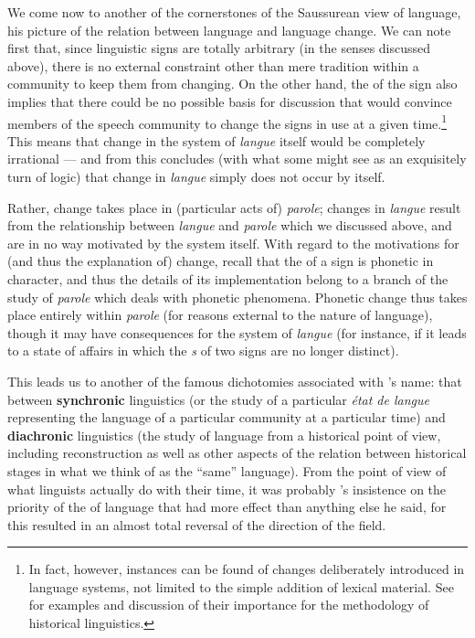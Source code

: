 We come now to another of the cornerstones of the Saussurean view of
language, his picture of the relation between language and language
change.  We can note first that, since linguistic signs are totally
arbitrary (in the senses discussed above), there is no external
constraint other than mere tradition within a community to keep them
from changing.  On the other hand, the  of the sign also
implies that there could be no possible basis for discussion that
would convince members of the speech community to change the signs in
use at a given time.\footnote{In fact, however, instances can be found
  of changes deliberately introduced in language systems, not limited
  to the simple addition of lexical material. See
  \citet{thomason06:intentional,thomason07:deliberate} for examples
  and discussion of their importance for the methodology of historical
  linguistics.}  This means that change in the system of \emph{langue}
itself would be completely irrational --- and from this {\Saussure}
concludes (with what some might see as an exquisitely  turn of
logic) that change in \emph{langue} simply does not occur by itself.

Rather, change takes place in (particular acts of) \emph{parole};
changes in \emph{langue} result from the relationship between
\emph{langue} and \emph{parole} which we discussed above, and
are in no way motivated by the system itself.  With regard to the
motivations for (and thus the {explanation} of) change, recall that the
\emph{} of a sign is phonetic in character, and thus the
details of its implementation belong to a branch of the study of
\emph{parole} which deals with phonetic phenomena.  Phonetic
change thus takes place entirely within \emph{parole} (for reasons
external to the nature of language), though it may have consequences
for the system of \emph{langue} (for instance, if it leads to a
state of affairs in which the \emph{s} of two signs are
no longer distinct).

This leads us to another of the famous dichotomies associated with
{\Saussure}'s name: that between \textbf{synchronic} linguistics (or
the study of a particular \emph{état de langue} representing the
language of a particular community at a particular time) and
\textbf{diachronic} linguistics (the study of language from a
historical point of view, including reconstruction as well as other
aspects of the relation between historical stages in what we think of
as the ``same'' language).  From the point of view of what linguists
actually do with their time, it was probably {\Saussure}'s insistence on
the priority of the  of language that had more effect
than anything else he said, for this resulted in an almost total
reversal of the direction of the field.

